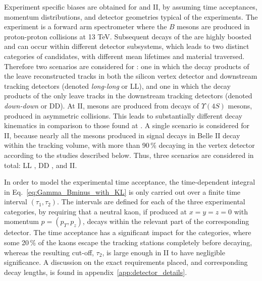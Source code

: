 Experiment specific biases are obtained for \lhcb and \belle II, by assuming time acceptances, momentum distributions, and detector geometries typical of the experiments.
The \lhcb experiment is a forward arm spectrometer where the $B$ mesons are produced in proton-proton collisions at 13 TeV. Subsequent decays of the \KS are highly boosted and can occur within different detector subsystems, which leads to two distinct categories of candidates, with different mean lifetimes and material traversed. Therefore  two scenarios are considered for \lhcb:  one in which the decay products of the \KS leave reconstructed tracks in both the silicon vertex detector and downstream tracking detectors (denoted \emph{long-long} or LL), and one in which the decay products of the \KS only leave tracks in the downstream tracking detectors (denoted \emph{down-down} or DD). At \belle II, \B mesons are produced from decays of $\Upsilon(4S)$ mesons, produced in asymmetric  collisions. This leads to substantially different decay kinematics in comparison to those found at \lhcb. A single scenario is considered for \belle II, because nearly all the \KS mesons produced in signal decays in Belle II decay within the tracking volume, with more than 90\,\% decaying in the vertex detector according to the studies described below. Thus, three scenarios are considered in total: LL \lhcb, DD \lhcb, and \belle II.

In order to model the experimental time acceptance, the time-dependent integral in Eq.~\eqref{eq:Gamma_Bminus_with_KL} is only carried out over a finite time interval $(\tau_1, \tau_2)$. The intervals are defined for each of the three experimental categories, by requiring that a neutral kaon, if produced at $x=y=z=0$ with momentum $p=(p_T, p_z)$, decays within the relevant part of the corresponding detector. The time acceptance has a significant impact for the \lhcb categories, where some 20\,\% of the kaons escape the tracking stations completely before decaying, whereas the resulting cut-off, $\tau_2$, is large enough in \belle II to have negligible significance. A discussion on the exact requirements placed, and corresponding decay lengths, is found in appendix~\ref{app:detector_details}. 



